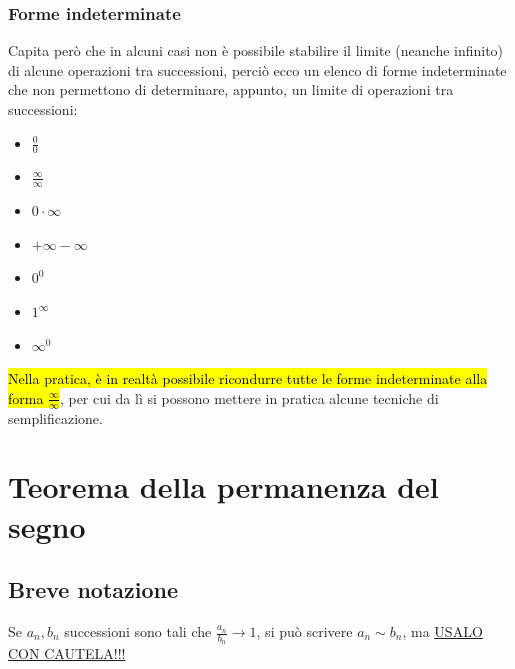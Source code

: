 \documentclass{article}
\theoremstyle{definition}
\begin{document}
\subsubsection{Forme indeterminate}
Capita però che in alcuni casi non è possibile stabilire il limite (neanche infinito) di alcune operazioni tra successioni, perciò ecco un elenco di forme indeterminate che non permettono di determinare, appunto, un limite di operazioni tra successioni:
\begin{itemize}
    \item $\frac{0}{0}$
    \item $\frac{\infty}{\infty}$
    \item $0 \cdot \infty$
    \item $+\infty-\infty$
    \item $0^0$
    \item $1^\infty$
    \item $\infty^0$
\end{itemize}
\hl{Nella pratica, è in realtà possibile ricondurre tutte le forme indeterminate alla forma $\frac{\infty}{\infty}$}, per cui da lì si possono mettere in pratica alcune tecniche di semplificazione.
\section{Teorema della permanenza del segno}
\subsection{Breve notazione}
Se $a_n,b_n$ successioni sono tali che $\frac{a_n}{b_n} \longrightarrow 1$, si può scrivere $a_n\sim b_n$, ma \underline{USALO CON CAUTELA!!!}
\end{document}
